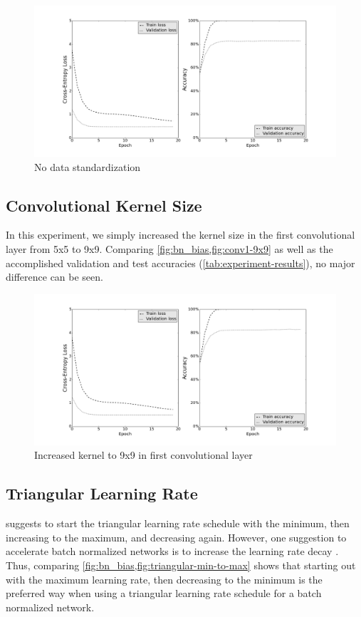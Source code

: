 \documentclass[a4paper, 11pt]{article}
\begin{document}
\begin{figure}[H]
	\includegraphics[width=\linewidth]{no-data-standardization.png}
	\caption{No data standardization }
	\label{fig:bn_no-data-standardization}
\end{figure}

\clearpage

\subsection{Convolutional Kernel Size}

In this experiment, we simply increased the kernel size in the first convolutional layer from 5x5 to 9x9. Comparing \cref{fig:bn_bias,fig:conv1-9x9} as well as the accomplished validation and test accuracies (\cref{tab:experiment-results}), no major difference can be seen.
\begin{figure}[H]
	\includegraphics[width=\linewidth]{conv1-9x9.png}
	\caption{Increased kernel to 9x9 in first convolutional layer }
	\label{fig:conv1-9x9}
\end{figure}

\clearpage

\subsection{Triangular Learning Rate}
\citet{Smith2015} suggests to start the triangular learning rate schedule with the minimum, then increasing to the maximum, and decreasing again.
However, one suggestion to accelerate batch normalized networks is to increase the learning rate decay \cite{Ioffe2015}.
Thus, comparing \cref{fig:bn_bias,fig:triangular-min-to-max} shows that starting out with the maximum learning rate, then decreasing to the minimum is the preferred way when using a triangular learning rate schedule for a batch normalized network.
\end{document}
